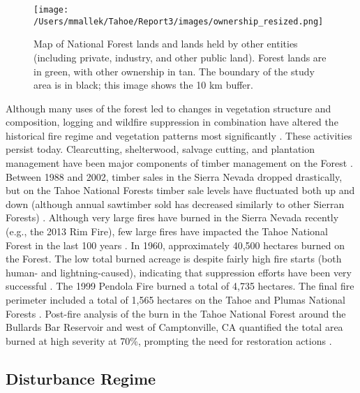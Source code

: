 \begin{figure}[!htbp]
\centering
\texttt{[image: /Users/mmallek/Tahoe/Report3/images/ownership\_resized.png]}
\caption{Map of National Forest lands and lands held by other entities (including private, industry, and other public land). Forest lands are in green, with other ownership in tan. The boundary of the study area is in black; this image shows the 10 km buffer.} 
\label{ownership}
\end{figure}

Although many uses of the forest led to changes in vegetation structure and composition, logging and wildfire suppression in combination have altered the historical fire regime and vegetation patterns most significantly \citep{Storer1963,Stephens2015,Knapp2013,Hessburg2005}. These activities persist today. Clearcutting, shelterwood, salvage cutting, and plantation management have been major components of timber management on the Forest \citep{USDAForestService2014}. Between 1988 and 2002, timber sales in the Sierra Nevada dropped drastically, but on the Tahoe National Forests timber sale levels have fluctuated both up and down (although annual sawtimber sold has decreased similarly to other Sierran Forests) \citep{USDAForestService2004}. Although very large fires have burned in the Sierra Nevada recently (e.g., the 2013 Rim Fire), few large fires have impacted the Tahoe National Forest in the last 100 years \citep{USDAForestService1990}. In 1960, approximately 40,500 hectares burned on the Forest. The low total burned acreage is despite fairly high fire starts (both human- and lightning-caused), indicating that suppression efforts have been very successful \citep{USDAForestService1990}. The 1999 Pendola Fire burned a total of 4,735 hectares. The final fire perimeter included a total of 1,565 hectares on the Tahoe and Plumas National Forests \citep{Shaw2009,USDOJ2009}. Post-fire analysis of the burn in the Tahoe National Forest around the Bullards Bar Reservoir and west of Camptonville, CA quantified the total area burned at high severity at 70\%, prompting the need for restoration actions \citep{USDAForestService1999}. 




\clearpage

\subsection{Disturbance Regime}
